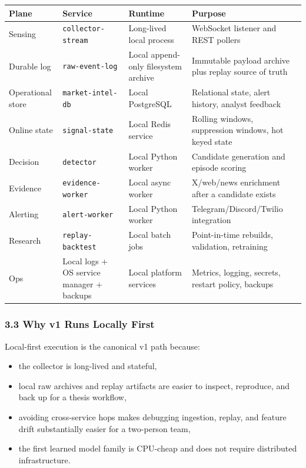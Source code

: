 \documentclass[
]{article}
\newcounter{none} %
\providecommand{\tightlist}{%
  \setlength{\itemsep}{0pt}\setlength{\parskip}{0pt}}
\begin{document}
{\def\LTcaptype{none} %
\begin{longtable}[]{@{}llll@{}}
\toprule\noalign{}
Plane & Service & Runtime & Purpose \\
\midrule\noalign{}
\endhead
\bottomrule\noalign{}
\endlastfoot
Sensing & \texttt{collector-stream} & Long-lived local process &
WebSocket listener and REST pollers \\
Durable log & \texttt{raw-event-log} & Local append-only filesystem
archive & Immutable payload archive plus replay source of truth \\
Operational store & \texttt{market-intel-db} & Local PostgreSQL &
Relational state, alert history, analyst feedback \\
Online state & \texttt{signal-state} & Local Redis service & Rolling
windows, suppression windows, hot keyed state \\
Decision & \texttt{detector} & Local Python worker & Candidate
generation and episode scoring \\
Evidence & \texttt{evidence-worker} & Local async worker & X/web/news
enrichment after a candidate exists \\
Alerting & \texttt{alert-worker} & Local Python worker &
Telegram/Discord/Twilio integration \\
Research & \texttt{replay-backtest} & Local batch jobs & Point-in-time
rebuilds, validation, retraining \\
Ops & Local logs + OS service manager + backups & Local platform
services & Metrics, logging, secrets, restart policy, backups \\
\end{longtable}
}

\subsubsection{3.3 Why v1 Runs Locally
First}\label{33-why-v1-runs-locally-first}

Local-first execution is the canonical v1 path because:

\begin{itemize}
\tightlist
\item
  the collector is long-lived and stateful,
\item
  local raw archives and replay artifacts are easier to inspect,
  reproduce, and back up for a thesis workflow,
\item
  avoiding cross-service hops makes debugging ingestion, replay, and
  feature drift substantially easier for a two-person team,
\item
  the first learned model family is CPU-cheap and does not require
  distributed infrastructure.
\end{itemize}
\end{document}
